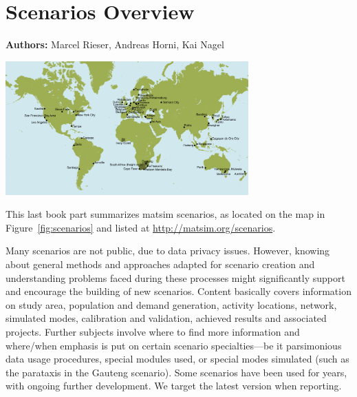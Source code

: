 \chapter{Scenarios Overview}
\label{ch:scenarios}

\hfill \textbf{Authors:} Marcel Rieser, Andreas Horni, Kai Nagel

\begin{center} \includegraphics[width=0.7\textwidth, angle=0]{./scenarios/figures/MATSimModelsMap} \end{center}


This last book part summarizes \gls{matsim} scenarios, as located on the map in Figure~\ref{fig:scenarios} and listed at \url{http://matsim.org/scenarios}.

Many scenarios are not public, due to data privacy issues. However, knowing about general methods and approaches adapted for scenario creation and understanding problems faced during these processes might significantly support and encourage the building of new scenarios. Content basically covers information on study area, population and demand generation, activity locations, network, simulated modes, calibration and validation, achieved results and associated projects. Further subjects involve where to find more information and where/when emphasis is put on certain scenario specialties---be it parsimonious data usage procedures, special modules used, or special modes simulated (such as the parataxis in the Gauteng scenario). Some scenarios have been used for years, with ongoing further development. We target the latest version when reporting. 

